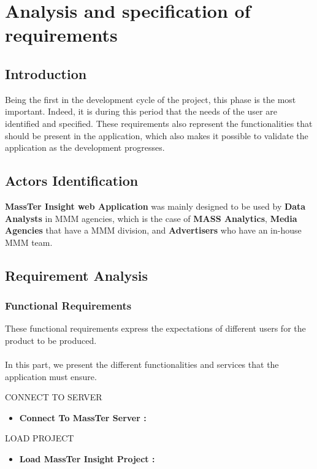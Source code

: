 

	\chapter{Analysis and specification of requirements}

	
	\section{Introduction}
	Being the first in the development cycle of the project, this phase is the most
	important. Indeed, it is during this period that the needs of the user are identified and specified. These requirements also represent the functionalities that should be present in the application, which also makes it possible to validate the application as the development progresses.
	\section{Actors Identification}
	\textbf{MassTer Insight web Application }was mainly designed to be used by \textbf{Data Analysts }in MMM agencies, which is the case of \textbf{MASS Analytics}, \textbf{Media Agencies }that have a MMM division, and \textbf{Advertisers }who have an in-house MMM team.
	
	\clearpage
	\newpage
	
	
	\section{Requirement Analysis}

	\subsection{Functional Requirements}
     
	These functional requirements express the expectations of different users for the product to be produced.
	\\
	\\
	In this part, we present the different functionalities and services that the application must ensure.
	
	CONNECT TO SERVER
	\begin{itemize}
		\setlength{\itemindent}{+.5in}
		\item \textbf{Connect To MassTer Server : } 
	\end{itemize}
	
	LOAD PROJECT
	\begin{itemize}
		\setlength{\itemindent}{+.5in}
     	\item \textbf{Load MassTer Insight Project : } 
    \end{itemize}	
 
